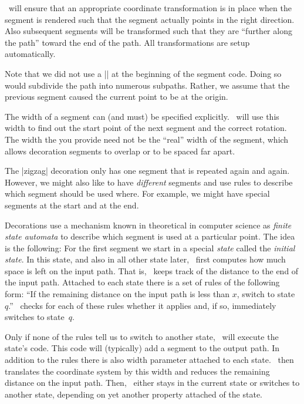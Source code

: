 \pgfname\ will ensure that an appropriate coordinate transformation
is in place when the segment is rendered such that
the segment actually points in the right direction. Also
subsequent segments will be transformed such that they are
``further along the path'' toward the end of the path.
All transformations are setup automatically.

Note that we did not use a |\pgfpathmoveto{\pgfpointorigin}| at the
beginning of the segment code. Doing so would subdivide the path into
numerous subpaths. Rather, we assume that the previous segment caused
the current point to be at the origin.

The width of a segment can (and must) be specified
explicitly. \pgfname\ will use this width to find out the start point
of the next segment and the correct rotation. The width the you
provide need not be the ``real'' width of the segment, which allows
decoration segments to overlap or to be spaced far apart. 

The |zigzag| decoration only has one segment that is repeated again and
again. However, we might also like to have \emph{different} segments
and use rules to describe which segment should be used where. For
example, we might have special segments at the start and at the end.

Decorations use a mechanism known in theoretical in computer science
as \emph{finite state automata} to describe which segment is used at a
particular point. The idea is the following: For the first segment we 
start in a special \emph{state} called the \emph{initial state}. In
this state, and also in all other state later, \pgfname\ first
computes how much space is left on the input path. That is, \pgfname\ keeps
track of the distance to the end of the input path. Attached to each state 
there is a set of rules of the following form: ``If the remaining 
distance on the input path is less than $x$, switch to state~$q$.''
\pgfname\ checks for each of these rules whether it applies and, if
so, immediately switches to state~$q$.

Only if none of the rules tell us to switch to another
state, \pgfname\ will execute the state's code. This code will
(typically) add a segment to the output path. In addition to the rules
there is also width parameter attached to each state. \pgfname\ then
translates the coordinate system by this width and reduces the
remaining distance on the input path. Then, \pgfname\ either stays in
the current state or switches to another state, depending on yet
another property attached of the state.

